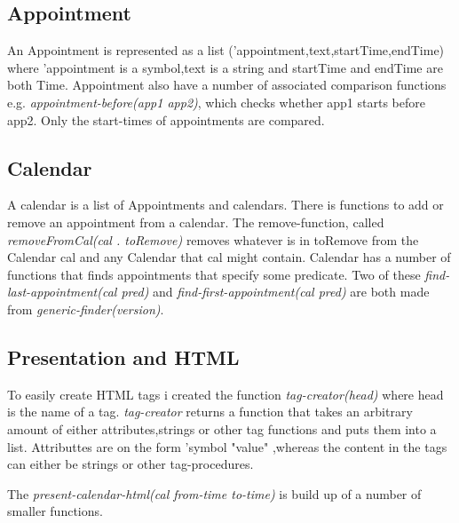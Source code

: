 \documentclass[a4paper]{article}
\begin{document}
\subsection{Appointment}
An Appointment is represented as a list ('appointment,text,startTime,endTime) where 'appointment is a symbol,text is a string and startTime and endTime are both Time. Appointment also have a number of associated comparison functions e.g. \textit{appointment-before(app1 app2)}, which checks whether app1 starts before app2. Only the start-times of appointments are compared. 

\subsection{Calendar}
A calendar is a list of Appointments and calendars. There is functions to add or remove an appointment from a calendar. The remove-function, called \textit{removeFromCal(cal . toRemove)} removes whatever is in toRemove from the Calendar cal and any Calendar that cal might contain. Calendar has a number of functions that finds appointments that specify some predicate. Two of these \textit{find-last-appointment(cal pred)} and \textit{find-first-appointment(cal pred)} are both made from \textit{generic-finder(version)}. 

\subsection{Presentation and HTML}
To easily create HTML tags i created the function \textit{tag-creator(head)} where head is the name of a tag. \textit{tag-creator} returns a function that takes an arbitrary amount of either attributes,strings or other tag functions and puts them into a list. Attributtes are on the form 'symbol "value" ,whereas the content in the tags can either be strings or other tag-procedures.

The \textit{present-calendar-html(cal from-time to-time)} is build up of a number of smaller functions. 
\end{document}
